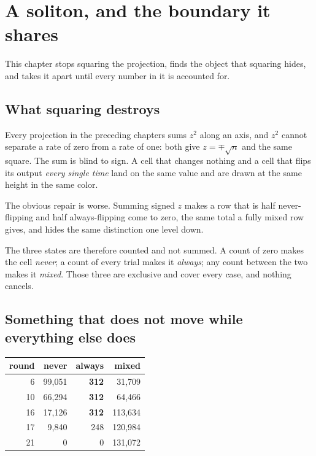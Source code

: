 \chapter{A soliton, and the boundary it shares}

This chapter stops squaring the projection, finds the object that squaring hides, and takes it apart
until every number in it is accounted for.

\section{What squaring destroys}

Every projection in the preceding chapters sums \(z^{2}\) along an axis, and \(z^{2}\) cannot
separate a rate of zero from a rate of one: both give \(z = \mp\sqrt{n}\) and the same square. The
sum is blind to sign. A cell that changes nothing and a cell that flips its output \emph{every
single time} land on the same value and are drawn at the same height in the same color.

The obvious repair is worse. Summing signed \(z\) makes a row that is half never-flipping and half
always-flipping come to zero, the same total a fully mixed row gives, and hides the same
distinction one level down.

The three states are therefore counted and not summed. A count of zero makes the cell \emph{never};
a count of every trial makes it \emph{always}; any count between the two makes it \emph{mixed}.
Those three are exclusive and cover every case, and nothing cancels.

\section{Something that does not move while everything else does}

\begin{center}
\begin{tabular}{rrrr}
\toprule
round & never & always & mixed \\
\midrule
6 & 99{,}051 & \textbf{312} & 31{,}709 \\
10 & 66{,}294 & \textbf{312} & 64{,}466 \\
16 & 17{,}126 & \textbf{312} & 113{,}634 \\
17 & 9{,}840 & 248 & 120{,}984 \\
21 & 0 & 0 & 131{,}072 \\
\bottomrule
\end{tabular}
\end{center}

